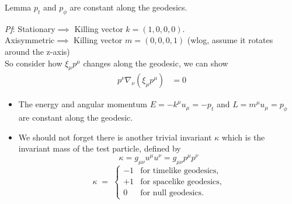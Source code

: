 \documentclass{beamer}
\begin{document}
\begin{frame}{}
\begin{block}{Lemma}
    $p_t$ and $p_{\phi}$ are constant along the geodesics.
\end{block}
\textit{Pf}:
    Stationary$\implies$ Killing vector $k=(1,0,0,0)$.\\
    Axisymmetric$\implies$ Killing vector $m=(0,0,0,1)$ (wlog, assume it rotates around the z-axis)\\
    So consider how $\xi_{\mu}p^{\mu}$ changes along the geodesic, we can show
    \begin{align}
        p^{\nu}\nabla_{\nu}(\xi_{\mu}p^{\mu})
        &=0
    \end{align}

    
\end{frame}


\begin{frame}{}
    \begin{itemize}
        \item The energy and angular momentum $E=-k^{\mu}u_{\mu}=-p_t$ and $L=m^{\mu}u_{\mu}=p_{\phi}$ are constant along the geodesic.
        \item  We should not forget there is another trivial invariant $\kappa$ which is the invariant mass of the test particle, defined by 
    \begin{equation}
        \kappa = g_{\mu\nu}u^{\mu}u^{\nu}=g_{\mu\nu}p^{\mu}p^{\nu}
    \end{equation}
    \[
    \kappa \;=\;
    \begin{cases}
    -1 & \text{for timelike geodesics},\\[6pt]
    +1 & \text{for spacelike geodesics},\\[6pt]
    0  & \text{for null geodesics}.
    \end{cases}
    \]
    \end{itemize}
\end{frame}
\end{document}
